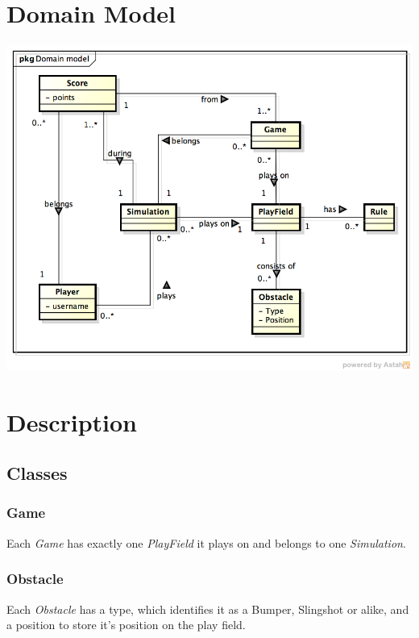 \documentclass[fontsize=12pt,
               paper=a4,
               twoside=false,
               parskip=half,
               ]{scrartcl}
\begin{document}
\newcommand{\doctitle}{Domain Model}


\tableofcontents

\section{Domain Model}

\includegraphics[width=15.5cm]{./img/domain-model.png}

\section{Description}

\subsection{Classes}

\subsubsection{Game}
Each \emph{Game} has exactly one \emph{PlayField} it plays on and belongs to one \emph{Simulation}. 

\subsubsection{Obstacle}
Each \emph{Obstacle} has a type, which identifies it as a Bumper, Slingshot or alike, and a position to store it's position on the play field.
\end{document}
